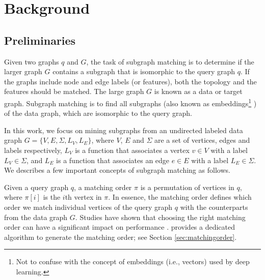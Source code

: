 \section{Background}
\subsection{Preliminaries}
Given two graphs $q$ and $G$, the task of subgraph matching is to determine if the larger graph $G$ contains a subgraph that is isomorphic
to the query graph $q$. If the graphs include node and edge labels (or features), both the topology and the features should be matched. The
large graph $G$ is known as a data or target graph.  Subgraph matching is to find all subgraphs (also known as embeddings\footnote{Not to
confuse with the concept of embeddings (i.e., vectors) used by deep learning.} ) of the data graph, which are isomorphic to the query
graph.

In this work, we focus on mining subgraphs from an undirected labeled data graph $G=\{V,E,\Sigma,L_V,L_E\}$, where $V$, $E$ and $\Sigma$
are a set of vertices, edges and labels respectively,  $L_V$ is a function that associates a vertex $v \in V$ with a label $L_V \in
\Sigma$, and $L_E$ is a function that associates an edge $e \in E$ with a label $L_E \in \Sigma$. We describes a few important concepts of
subgraph matching as follows.



 Given a query graph $q$, a matching order $\pi$ is a permutation of vertices in $q$, where $\pi[i]$ is the
$i$th vertex in $\pi$. In essence, the matching order defines which order we match individual vertices of the query graph $q$ with the
counterparts from the data graph $G$. Studies have shown that choosing the right matching order can have a significant impact on
performance \cite{bi2016efficient,sun2020subgraph,sun2020rapidmatch,guo2020gpu}.  \SystemName provides a dedicated algorithm to generate
the matching order; see Section \ref {sec:matchingorder}.

